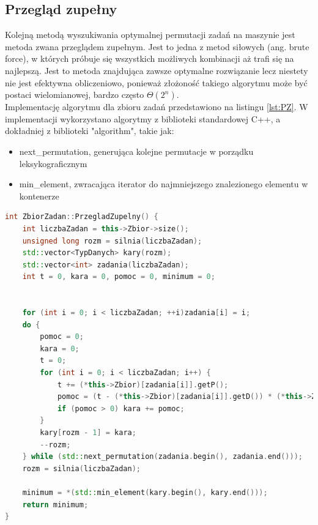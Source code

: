 \documentclass[a4paper]{article}
\begin{document}
\subsection{Przegląd zupełny}
Kolejną metodą wyszukiwania optymalnej permutacji zadań na maszynie jest metoda zwana przeglądem zupełnym. Jest to jedna z metod siłowych (ang. brute force), w których próbuje się wszystkich możliwych kombinacji aż trafi się na najlepszą. Jest to metoda znajdująca zawsze optymalne rozwiązanie lecz niestety nie jest efektywna obliczeniowo, ponieważ złożoność takiego algorytmu może być postaci wielomianowej, bardzo często $\Theta(2^{n})$. 
\\
Implementację algorytmu dla zbioru zadań przedstawiono na listingu \ref{lst:PZ}. W implementacji wykorzystano algorytmy z biblioteki standardowej C++, a dokładniej z biblioteki "algorithm", takie jak:
\begin{itemize}
\item next\_permutation, generująca kolejne permutacje w porządku leksykograficznym
\item min\_element, zwracająca iterator do najmniejszego znalezionego elementu w kontenerze
\end{itemize}
\begin{lstlisting}[firstline = 3,label={lst:PZ},caption={Algorytm Przeglądu zupełnego},language=C++]
int ZbiorZadan::PrzegladZupelny() {
    int liczbaZadan = this->Zbior->size();
    unsigned long rozm = silnia(liczbaZadan);
    std::vector<TypDanych> kary(rozm);
    std::vector<int> zadania(liczbaZadan);
    int t = 0, kara = 0, pomoc = 0, minimum = 0;


    for (int i = 0; i < liczbaZadan; ++i)zadania[i] = i;
    do {
        pomoc = 0;
        kara = 0;
        t = 0;
        for (int i = 0; i < liczbaZadan; i++) {
            t += (*this->Zbior)[zadania[i]].getP();
            pomoc = (t - (*this->Zbior)[zadania[i]].getD()) * (*this->Zbior)[zadania[i]].getW();
            if (pomoc > 0) kara += pomoc;
        }
        kary[rozm - 1] = kara;
        --rozm;
    } while (std::next_permutation(zadania.begin(), zadania.end()));
    rozm = silnia(liczbaZadan);

    minimum = *(std::min_element(kary.begin(), kary.end()));
    return minimum;
}
\end{lstlisting}


\newpage
\end{document}
